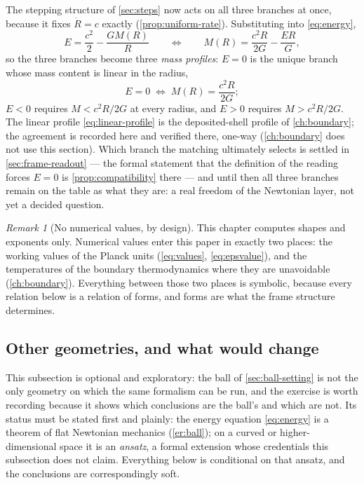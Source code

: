 \documentclass[11pt]{amsbook}
\theoremstyle{plain}
\theoremstyle{definition}
\theoremstyle{remark}
\newtheorem{remark}[theorem]{Remark}
\begin{document}
The stepping structure of \cref{sec:steps} now acts on all three branches at once, because it fixes $\dot R = c$ exactly (\cref{prop:uniform-rate}). Substituting into \cref{eq:energy},
\begin{equation}\label{eq:branches-stepped}
E = \frac{c^{2}}{2} - \frac{G M(R)}{R}
\qquad\Longleftrightarrow\qquad
M(R) = \frac{c^{2} R}{2 G} - \frac{E R}{G},
\end{equation}
so the three branches become three \emph{mass profiles}: $E = 0$ is the unique branch whose mass content is linear in the radius,
\begin{equation}\label{eq:linear-profile}
E = 0 \;\Longleftrightarrow\; M(R) = \frac{c^{2} R}{2 G};
\end{equation}
$E < 0$ requires $M < c^{2}R/2G$ at every radius, and $E > 0$ requires $M > c^{2}R/2G$. The linear profile \cref{eq:linear-profile} is the deposited-shell profile of \cref{ch:boundary}; the agreement is recorded here and verified there, one-way (\cref{ch:boundary} does not use this section). Which branch the matching ultimately selects is settled in \cref{sec:frame-readout} --- the formal statement that the definition of the reading forces $E = 0$ is \cref{prop:compatibility} there --- and until then all three branches remain on the table as what they are: a real freedom of the Newtonian layer, not yet a decided question.

\begin{remark}[No numerical values, by design]\label{rem:no-numbers}
This chapter computes shapes and exponents only. Numerical values enter this paper in exactly two places: the working values of the Planck units (\cref{eq:values}, \cref{eq:epsvalue}), and the temperatures of the boundary thermodynamics where they are unavoidable (\cref{ch:boundary}). Everything between those two places is symbolic, because every relation below is a relation of forms, and forms are what the frame structure determines.
\end{remark}

\subsection{Other geometries, and what would change}\label{sec:other-geometries}

This subsection is optional and exploratory: the ball of \cref{sec:ball-setting} is not the only geometry on which the same formalism can be run, and the exercise is worth recording because it shows which conclusions are the ball's and which are not. Its status must be stated first and plainly: the energy equation \cref{eq:energy} is a theorem of flat Newtonian mechanics (\cref{er:ball}); on a curved or higher-dimensional space it is an \emph{ansatz}, a formal extension whose credentials this subsection does not claim. Everything below is conditional on that ansatz, and the conclusions are correspondingly soft.
\end{document}
